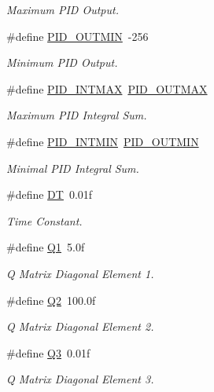 \begin{DoxyCompactItemize}
\begin{DoxyCompactList}\small\item\em Maximum P\-I\-D Output. \end{DoxyCompactList}\item 
\#define \hyperlink{group__config_ga684067981e82e4827607d0b0558812cb}{P\-I\-D\-\_\-\-O\-U\-T\-M\-I\-N}~-\/256
\begin{DoxyCompactList}\small\item\em Minimum P\-I\-D Output. \end{DoxyCompactList}\item 
\#define \hyperlink{group__config_ga50582411cbb3f8a20ffd3aa2254ddf71}{P\-I\-D\-\_\-\-I\-N\-T\-M\-A\-X}~\hyperlink{group__config_gaf36e4eab421932a006c7df7e84f11cf0}{P\-I\-D\-\_\-\-O\-U\-T\-M\-A\-X}
\begin{DoxyCompactList}\small\item\em Maximum P\-I\-D Integral Sum. \end{DoxyCompactList}\item 
\#define \hyperlink{group__config_ga9ee651f30455f25b5ca4c4bb9a0a6e49}{P\-I\-D\-\_\-\-I\-N\-T\-M\-I\-N}~\hyperlink{group__config_ga684067981e82e4827607d0b0558812cb}{P\-I\-D\-\_\-\-O\-U\-T\-M\-I\-N}
\begin{DoxyCompactList}\small\item\em Minimal P\-I\-D Integral Sum. \end{DoxyCompactList}\item 
\#define \hyperlink{group__config_ga943f07034774ef1261d62cd0d3d1fec9}{D\-T}~0.\-01f
\begin{DoxyCompactList}\small\item\em Time Constant. \end{DoxyCompactList}\item 
\#define \hyperlink{group__config_ga0f32727853a3ac3d848701803c3b8688}{Q1}~5.\-0f
\begin{DoxyCompactList}\small\item\em Q Matrix Diagonal Element 1. \end{DoxyCompactList}\item 
\#define \hyperlink{group__config_gaf5bca4c32f8c6886a3d8c526d2e3e9a7}{Q2}~100.\-0f
\begin{DoxyCompactList}\small\item\em Q Matrix Diagonal Element 2. \end{DoxyCompactList}\item 
\#define \hyperlink{group__config_ga1d7d3dfd2c4618949c484c5e8369f05a}{Q3}~0.\-01f
\begin{DoxyCompactList}\small\item\em Q Matrix Diagonal Element 3. \end{DoxyCompactList}\item 

\end{DoxyCompactItemize}
